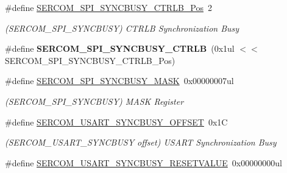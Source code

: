 \begin{DoxyCompactItemize}
\item 
\hypertarget{group___s_a_m_l21___s_e_r_c_o_m_gaa0e9ff23ebbc42d93b7830ecda0058ab}{}\#define \hyperlink{group___s_a_m_l21___s_e_r_c_o_m_gaa0e9ff23ebbc42d93b7830ecda0058ab}{S\+E\+R\+C\+O\+M\+\_\+\+S\+P\+I\+\_\+\+S\+Y\+N\+C\+B\+U\+S\+Y\+\_\+\+C\+T\+R\+L\+B\+\_\+\+Pos}~2\label{group___s_a_m_l21___s_e_r_c_o_m_gaa0e9ff23ebbc42d93b7830ecda0058ab}

\begin{DoxyCompactList}\small\item\em (S\+E\+R\+C\+O\+M\+\_\+\+S\+P\+I\+\_\+\+S\+Y\+N\+C\+B\+U\+S\+Y) C\+T\+R\+L\+B Synchronization Busy \end{DoxyCompactList}\item 
\hypertarget{group___s_a_m_l21___s_e_r_c_o_m_ga4c26926c60fdd321c81d6fdd4208929c}{}\#define {\bfseries S\+E\+R\+C\+O\+M\+\_\+\+S\+P\+I\+\_\+\+S\+Y\+N\+C\+B\+U\+S\+Y\+\_\+\+C\+T\+R\+L\+B}~(0x1ul $<$$<$ S\+E\+R\+C\+O\+M\+\_\+\+S\+P\+I\+\_\+\+S\+Y\+N\+C\+B\+U\+S\+Y\+\_\+\+C\+T\+R\+L\+B\+\_\+\+Pos)\label{group___s_a_m_l21___s_e_r_c_o_m_ga4c26926c60fdd321c81d6fdd4208929c}

\item 
\hypertarget{group___s_a_m_l21___s_e_r_c_o_m_ga8692da7f26c5c11f01cc172fb4203554}{}\#define \hyperlink{group___s_a_m_l21___s_e_r_c_o_m_ga8692da7f26c5c11f01cc172fb4203554}{S\+E\+R\+C\+O\+M\+\_\+\+S\+P\+I\+\_\+\+S\+Y\+N\+C\+B\+U\+S\+Y\+\_\+\+M\+A\+S\+K}~0x00000007ul\label{group___s_a_m_l21___s_e_r_c_o_m_ga8692da7f26c5c11f01cc172fb4203554}

\begin{DoxyCompactList}\small\item\em (S\+E\+R\+C\+O\+M\+\_\+\+S\+P\+I\+\_\+\+S\+Y\+N\+C\+B\+U\+S\+Y) M\+A\+S\+K Register \end{DoxyCompactList}\item 
\hypertarget{group___s_a_m_l21___s_e_r_c_o_m_ga1557d3396322169756146fd3623e8320}{}\#define \hyperlink{group___s_a_m_l21___s_e_r_c_o_m_ga1557d3396322169756146fd3623e8320}{S\+E\+R\+C\+O\+M\+\_\+\+U\+S\+A\+R\+T\+\_\+\+S\+Y\+N\+C\+B\+U\+S\+Y\+\_\+\+O\+F\+F\+S\+E\+T}~0x1\+C\label{group___s_a_m_l21___s_e_r_c_o_m_ga1557d3396322169756146fd3623e8320}

\begin{DoxyCompactList}\small\item\em (S\+E\+R\+C\+O\+M\+\_\+\+U\+S\+A\+R\+T\+\_\+\+S\+Y\+N\+C\+B\+U\+S\+Y offset) U\+S\+A\+R\+T Synchronization Busy \end{DoxyCompactList}\item 
\hypertarget{group___s_a_m_l21___s_e_r_c_o_m_gaf32900cc1fa0e2f4f570733664d2268c}{}\#define \hyperlink{group___s_a_m_l21___s_e_r_c_o_m_gaf32900cc1fa0e2f4f570733664d2268c}{S\+E\+R\+C\+O\+M\+\_\+\+U\+S\+A\+R\+T\+\_\+\+S\+Y\+N\+C\+B\+U\+S\+Y\+\_\+\+R\+E\+S\+E\+T\+V\+A\+L\+U\+E}~0x00000000ul\label{group___s_a_m_l21___s_e_r_c_o_m_gaf32900cc1fa0e2f4f570733664d2268c}


\end{DoxyCompactItemize}
